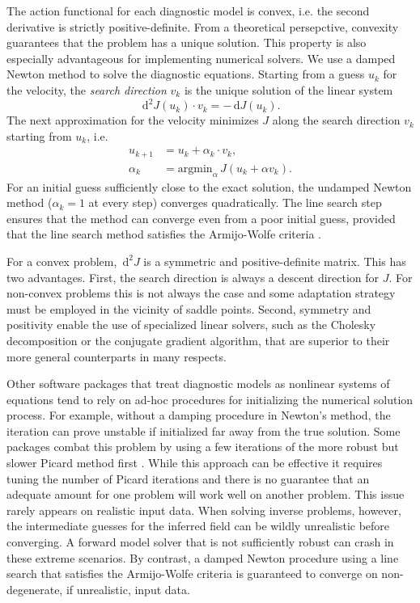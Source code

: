 \documentclass{article}
\theoremstyle{definition}
\theoremstyle{plain}
\newcommand{\ud}{\hspace{2pt}\mathrm{d}}
\begin{document}
The action functional for each diagnostic model is convex, i.e. the second derivative is strictly positive-definite.
From a theoretical persepctive, convexity guarantees that the problem has a unique solution.
This property is also especially advantageous for implementing numerical solvers.
We use a damped Newton method to solve the diagnostic equations.
Starting from a guess $u_k$ for the velocity, the \emph{search direction} $v_k$ is the unique solution of the linear system
\begin{equation}
    \ud^2J(u_k)\cdot v_k = -\ud J(u_k).
    \label{eq:newton-search-direction}
\end{equation}
The next approximation for the velocity minimizes $J$ along the search direction $v_k$ starting from $u_k$, i.e.
\begin{align}
    u_{k + 1} & = u_k + \alpha_k\cdot v_k, \nonumber\\
    \alpha_k & = \text{argmin}_\alpha \hspace{2pt}J(u_k + \alpha v_k).
\end{align}
For an initial guess sufficiently close to the exact solution, the undamped Newton method ($\alpha_k = 1$ at every step) converges quadratically.
The line search step ensures that the method can converge even from a poor initial guess, provided that the line search method satisfies the Armijo-Wolfe criteria \citep{nocedal2006numerical}.

For a convex problem, $\ud^2J$ is a symmetric and positive-definite matrix.
This has two advantages.
First, the search direction is always a descent direction for $J$.
For non-convex problems this is not always the case and some adaptation strategy must be employed in the vicinity of saddle points.
Second, symmetry and positivity enable the use of specialized linear solvers, such as the Cholesky decomposition or the conjugate gradient algorithm, that are superior to their more general counterparts in many respects.

Other software packages that treat diagnostic models as nonlinear systems of equations tend to rely on ad-hoc procedures for initializing the numerical solution process.
For example, without a damping procedure in Newton's method, the iteration can prove unstable if initialized far away from the true solution.
Some packages combat this problem by using a few iterations of the more robust but slower Picard method first \citep{gagliardini2013capabilities}.
While this approach can be effective it requires tuning the number of Picard iterations and there is no guarantee that an adequate amount for one problem will work well on another problem.
This issue rarely appears on realistic input data.
When solving inverse problems, however, the intermediate guesses for the inferred field can be wildly unrealistic before converging.
A forward model solver that is not sufficiently robust can crash in these extreme scenarios.
By contrast, a damped Newton procedure using a line search that satisfies the Armijo-Wolfe criteria is guaranteed to converge on non-degenerate, if unrealistic, input data.
\end{document}
